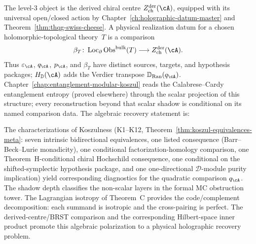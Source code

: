 The level-$3$ object is the derived chiral centre
$Z^{\mathrm{der}}_{\mathrm{ch}}(\cA)$, equipped with its universal
open/closed action by Chapter~\ref{ch:holographic-datum-master} and
Theorem~\ref{thm:thqg-swiss-cheese}.  A physical realization datum for
a chosen holomorphic-topological theory~$T$ is a comparison
\[
 \beta_T\colon
 \operatorname{Loc}_{\partial}\operatorname{Obs}^{\mathrm{bulk}}(T)
 \longrightarrow Z^{\mathrm{der}}_{\mathrm{ch}}(\cA).
\]
Thus $\varepsilon_\cA$, $q_\cA$, $p_\cA$, and $\beta_T$ have distinct
sources, targets, and hypothesis packages; $H_{\mathbb D}(\cA)$ adds
the Verdier transpose $\mathbb D_{\operatorname{Ran}}(q_\cA)$.
Chapter~\ref{chap:entanglement-modular-koszul} reads the
Calabrese--Cardy entanglement entropy (proved elsewhere) through the
scalar projection of this structure; every reconstruction beyond that
scalar shadow is conditional on its named comparison data.
The algebraic recovery statement is:

\begin{center}
\end{center}

\noindent
The characterizations of Koszulness (K1--K12,
Theorem~\ref{thm:koszul-equivalences-meta}: seven intrinsic
bidirectional equivalences, one listed consequence
(Barr--Beck--Lurie monadicity), one conditional
factorization-homology comparison, one Theorem~H-conditional chiral
Hochschild consequence, one conditional on the shifted-symplectic
hypothesis package, and one one-directional
$\mathcal D$-module purity implication) yield corresponding diagnostics
for the quadratic comparison $q_\cA$.
The shadow depth classifies the non-scalar layers in the formal
MC obstruction tower.
The Lagrangian isotropy of Theorem~C provides the code/complement
decomposition: each summand is isotropic and the cross-pairing is
perfect.  The derived-centre/BRST comparison and the corresponding
Hilbert-space inner product promote this algebraic polarization to a
physical holographic recovery problem.

